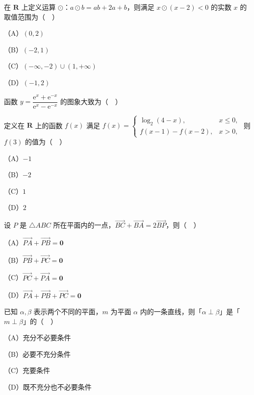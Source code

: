 \begin{question}
在 $\mathbf R$ 上定义运算 $\odot$：$a\odot b=ab+2a+b$，则满足 $x\odot(x-2)<0$ 的实数 $x$ 的取值范围为（　）

（A）$(0,2)$

（B）$(-2,1)$

（C）$(-\infty,-2)\cup(1,+\infty)$

（D）$(-1,2)$

\Needspace{0.4\textheight}
\end{question}
\begin{question}
函数 $y=\dfrac{\mathrm e^x+\mathrm e^{-x}}{\mathrm e^x-\mathrm e^{-x}}$ 的图象大致为（　）
\nopagebreak[4]
\begin{center}\end{center}
\nopagebreak[4]
\end{question}
\begin{question}
定义在 $\mathbf R$ 上的函数 $f(x)$ 满足 $f(x)=\begin{cases}\log_2(4-x),&x\leqslant0,\\ f(x-1)-f(x-2),&x>0,\end{cases}$ 则 $f(3)$ 的值为（　）

（A）$-1$

（B）$-2$

（C）$1$

（D）$2$

\end{question}
\begin{question}
设 $P$ 是 $\triangle ABC$ 所在平面内的一点，$\overrightarrow{BC}+\overrightarrow{BA}=2\overrightarrow{BP}$，则（　）

（A）$\overrightarrow{PA}+\overrightarrow{PB}=\mathbf 0$

（B）$\overrightarrow{PB}+\overrightarrow{PC}=\mathbf 0$

（C）$\overrightarrow{PC}+\overrightarrow{PA}=\mathbf 0$

（D）$\overrightarrow{PA}+\overrightarrow{PB}+\overrightarrow{PC}=\mathbf 0$

\end{question}
\begin{question}
已知 $\alpha,\beta$ 表示两个不同的平面，$m$ 为平面 $\alpha$ 内的一条直线，则「$\alpha\perp\beta$」是「$m\perp\beta$」的（　）

（A）充分不必要条件

（B）必要不充分条件

（C）充要条件

（D）既不充分也不必要条件

\end{question}
